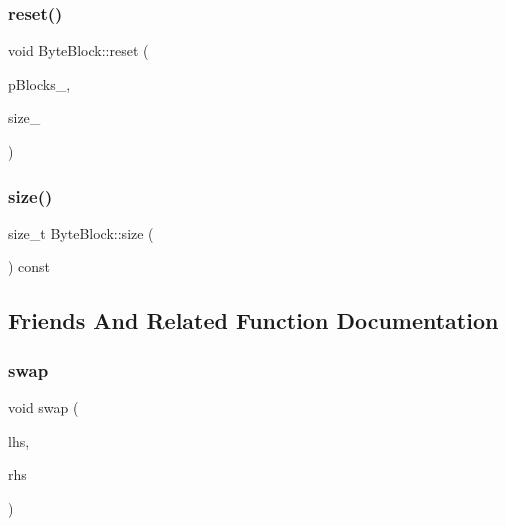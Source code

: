 \mbox{\label{class_byte_block_aba0c3bafa18238bb269ec40962baa3c1}} 
\subsubsection{\texorpdfstring{reset()}{reset()}}
{\footnotesize\ttfamily void Byte\+Block\+::reset (\begin{DoxyParamCaption}\item[{const \hyperlink{mycrypto_8hpp_a4ae1dab0fb4b072a66584546209e7d58}{B\+Y\+TE} $\ast$}]{p\+Blocks\+\_\+,  }\item[{size\+\_\+t}]{size\+\_\+ }\end{DoxyParamCaption})}

\mbox{\label{class_byte_block_a160a348384c35cd7beae4e123b74bf18}} 
\subsubsection{\texorpdfstring{size()}{size()}}
{\footnotesize\ttfamily size\+\_\+t Byte\+Block\+::size (\begin{DoxyParamCaption}{ }\end{DoxyParamCaption}) const}



\subsection{Friends And Related Function Documentation}
\mbox{\label{class_byte_block_aff71aa0d084ae3b604be05fa66e1d4cd}} 
\subsubsection{\texorpdfstring{swap}{swap}}
{\footnotesize\ttfamily void swap (\begin{DoxyParamCaption}\item[{\hyperlink{class_byte_block}{Byte\+Block} \&}]{lhs,  }\item[{\hyperlink{class_byte_block}{Byte\+Block} \&}]{rhs }\end{DoxyParamCaption})\hspace{0.3cm}{\ttfamily [friend]}}




